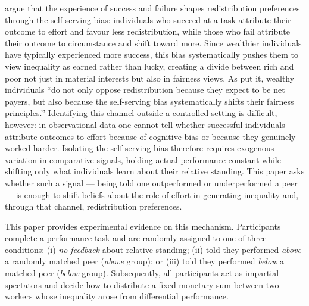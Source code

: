 \documentclass[12pt]{article}
\begin{document}
\citet{Deffains2016} argue that the experience of success and failure
shapes redistribution preferences through the self-serving bias:
individuals who succeed at a task attribute their outcome to effort and
favour less redistribution, while those who fail attribute their outcome
to circumstance and shift toward more.
Since wealthier individuals have typically experienced more success, this
bias systematically pushes them to view inequality as earned rather than
lucky, creating a divide between rich and poor not just in material
interests but also in fairness views.
As \citet{Deffains2016} put it, wealthy individuals ``do not only oppose
redistribution because they expect to be net payers, but also because the
self-serving bias systematically shifts their fairness principles.’’
Identifying this channel outside a controlled setting is difficult, however:
in observational data one cannot tell whether successful individuals
attribute outcomes to effort because of cognitive bias or because they
genuinely worked harder.
Isolating the self-serving bias therefore requires exogenous variation in
comparative signals, holding actual performance constant while shifting
only what individuals learn about their relative standing.
This paper asks whether such a signal --- being told one outperformed or
underperformed a peer --- is enough to shift beliefs about the role of
effort in generating inequality and, through that channel, redistribution
preferences.

This paper provides experimental evidence on this mechanism.
Participants complete a performance task and are randomly assigned to one of
three conditions: (i) \emph{no feedback} about relative standing; (ii) told
they performed \emph{above} a randomly matched peer (\emph{above} group);
or (iii) told they performed \emph{below} a matched peer (\emph{below}
group).
Subsequently, all participants act as impartial spectators and decide how to
distribute a fixed monetary sum between two workers whose inequality arose
from differential performance.
\end{document}
